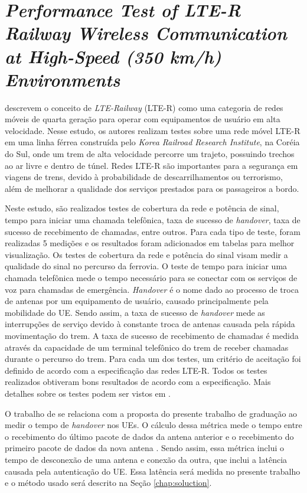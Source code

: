 \section{\textit{Performance Test of LTE-R Railway Wireless Communication at High-Speed (350 km/h) Environments}}

 descrevem o conceito de \textit{LTE-Railway} (LTE-R) como uma categoria de redes móveis de quarta geração para operar com equipamentos de usuário em alta velocidade.
Nesse estudo, os autores realizam testes sobre uma rede móvel LTE-R em uma linha férrea construída pelo \textit{Korea Railroad Research Institute}, na Coréia do Sul, onde um trem de alta velocidade percorre um trajeto, possuindo trechos ao ar livre e dentro de túnel.
Redes LTE-R são importantes para a segurança em viagens de trens, devido à probabilidade de descarrilhamentos ou terrorismo, além de melhorar a qualidade dos serviços prestados para os passageiros a bordo.

Neste estudo, são realizados testes de cobertura da rede e potência de sinal, tempo para iniciar uma chamada telefônica, taxa de sucesso de \textit{handover}, taxa de sucesso de recebimento de chamadas, entre outros.
Para cada tipo de teste, foram realizadas 5 medições e os resultados foram adicionados em tabelas para melhor visualização.
Os testes de cobertura da rede e potência do sinal visam medir a qualidade do sinal no percurso da ferrovia.
O teste de tempo para iniciar uma chamada telefônica mede o tempo necessário para se conectar com os serviços de voz para chamadas de emergência.
\textit{Handover} é o nome dado ao processo de troca de antenas por um equipamento de usuário, causado principalmente pela mobilidade do UE. Sendo assim, a taxa de sucesso de \textit{handover} mede as interrupções de serviço devido à constante troca de antenas causada pela rápida movimentação do trem.
A taxa de sucesso de recebimento de chamadas é medida através da capacidade de um terminal telefônico do trem de receber chamadas durante o percurso do trem.
Para cada um dos testes, um critério de aceitação foi definido de acordo com a especificação das redes LTE-R. Todos os testes realizados obtiveram bons resultados de acordo com a especificação. Mais detalhes sobre os testes podem ser vistos em .

O trabalho de  se relaciona com a proposta do presente trabalho de graduação ao medir o tempo de \textit{handover} nos UEs.
O cálculo dessa métrica mede o tempo entre o recebimento do último pacote de dados da antena anterior e o recebimento do primeiro pacote de dados da nova antena \cite{Tayyab2019}.
Sendo assim, essa métrica inclui o tempo de desconexão de uma antena e conexão da outra, que inclui a latência causada pela autenticação do UE.
Essa latência será medida no presente trabalho e o método usado será descrito na Seção \ref{chap:soluction}.
